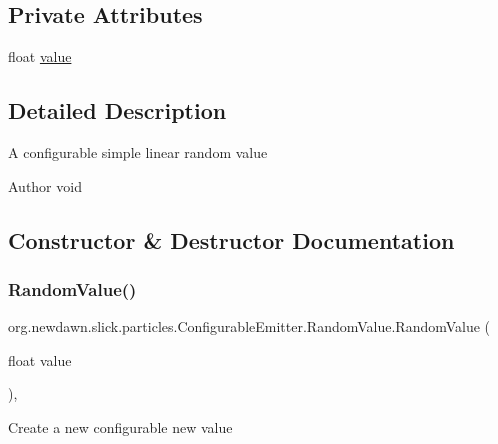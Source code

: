 \subsection*{Private Attributes}
\begin{DoxyCompactItemize}
\item 
float \mbox{\hyperlink{classorg_1_1newdawn_1_1slick_1_1particles_1_1_configurable_emitter_1_1_random_value_a79aeb62a3f0873cf7ca46240f9e37d09}{value}}
\end{DoxyCompactItemize}


\subsection{Detailed Description}
A configurable simple linear random value

\begin{DoxyAuthor}{Author}
void 
\end{DoxyAuthor}


\subsection{Constructor \& Destructor Documentation}
\mbox{\label{classorg_1_1newdawn_1_1slick_1_1particles_1_1_configurable_emitter_1_1_random_value_a8294b0a87ef3fd63daf50ae941ceb20e}} 
\subsubsection{\texorpdfstring{Random\+Value()}{RandomValue()}}
{\footnotesize\ttfamily org.\+newdawn.\+slick.\+particles.\+Configurable\+Emitter.\+Random\+Value.\+Random\+Value (\begin{DoxyParamCaption}\item[{float}]{value }\end{DoxyParamCaption})\hspace{0.3cm}{\ttfamily [inline]}, {\ttfamily [private]}}

Create a new configurable new value


